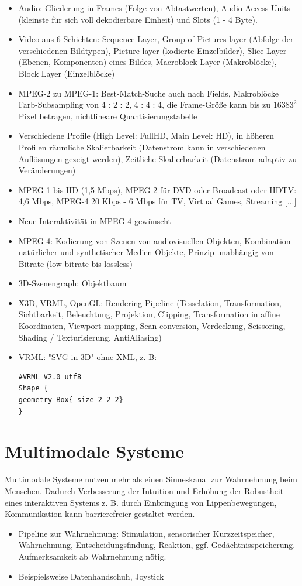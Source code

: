 \documentclass[12pt,landscape]{article}
\begin{document}
\begin{multicols}{3}
\begin{itemize}
\item Audio: Gliederung in Frames (Folge von Abtastwerten), Audio Access Units (kleinste für sich voll dekodierbare Einheit) und Slots (1 - 4 Byte).
\item Video aus 6 Schichten: Sequence Layer, Group of Pictures layer (Abfolge der verschiedenen Bildtypen), Picture layer (kodierte Einzelbilder), Slice Layer (Ebenen, Komponenten) eines Bildes, Macroblock Layer (Makroblöcke), Block Layer (Einzelblöcke)
\item MPEG-2 zu MPEG-1: Best-Match-Suche auch nach Fields, Makroblöcke Farb-Subsampling von 4 : 2 : 2, 4 : 4 : 4, die Frame-Größe kann bis zu $16383^2$ Pixel betragen, nichtlineare Quantisierungstabelle
\item Verschiedene Profile (High Level: FullHD, Main Level: HD), in höheren Profilen räumliche Skalierbarkeit (Datenstrom kann in verschiedenen Auflösungen gezeigt werden), Zeitliche Skalierbarkeit (Datenstrom adaptiv zu Veränderungen)
\item MPEG-1 bis HD (1,5 Mbps), MPEG-2 für DVD oder Broadcast oder HDTV: 4,6 Mbps, MPEG-4 20 Kbps - 6 Mbps für TV, Virtual Games, Streaming [...]
\item Neue Interaktivität in MPEG-4 gewünscht
\item MPEG-4: Kodierung von Szenen von audiovisuellen Objekten, Kombination natürlicher und synthetischer Medien-Objekte, Prinzip unabhängig von Bitrate (low bitrate bis lossless)
\item 3D-Szenengraph: Objektbaum
\item X3D, VRML, OpenGL: Rendering-Pipeline (Tesselation, Transformation, Sichtbarkeit, Beleuchtung, Projektion, Clipping, Transformation in affine Koordinaten, Viewport mapping, Scan conversion, Verdeckung, Scissoring, Shading / Texturisierung, AntiAliasing)
\item VRML: "SVG in 3D" ohne XML, z. B:
\begin{lstlisting}
#VRML V2.0 utf8
Shape {
geometry Box{ size 2 2 2}
}
\end{lstlisting}
\end{itemize}
\section{Multimodale Systeme}
Multimodale Systeme nutzen mehr als einen Sinneskanal zur Wahrnehmung beim Menschen. Dadurch Verbesserung der Intuition und Erhöhung der Robustheit eines interaktiven Systems z. B. durch Einbringung von Lippenbewegungen, Kommunikation kann barrierefreier gestaltet werden.
\begin{itemize}
\item Pipeline zur Wahrnehmung: Stimulation, sensorischer Kurzzeitspeicher, Wahrnehmung, Entscheidungsfindung, Reaktion, ggf. Gedächtnisspeicherung. Aufmerksamkeit ab Wahrnehmung nötig.
\item Beispielsweise Datenhandschuh, Joystick
\end{itemize}

\end{multicols}
\end{document}
